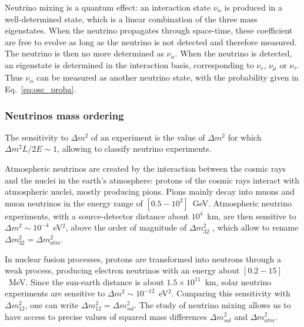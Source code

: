 Neutrino mixing is a quantum effect: an interaction state $\nu_{\alpha}$ is produced in a well-determined state, which is a linear combination of the three mass eigenstates.
When the neutrino propagates through space-time, these coefficient are free to evolve as long as the neutrino is not detected and therefore measured.
The neutrino is then no more determined as $\nu_{\alpha}$.
When the neutrino is detected, an eigenstate is determined in the interaction basis, corresponding to $\nu_e$, $\nu_{\mu}$ or $\nu_{\tau}$.
Thus $\nu_{\alpha}$ can be measured as another neutrino state, with the probability given in Eq.~\eqref{eq:osc_proba}.

\subsubsection*{Neutrinos mass ordering}

The sensitivity to $\Delta m^2$ of an experiment is the value of $\Delta m^2$ for which ${\Delta m^2 L/2E \sim 1}$, allowing to classify neutrino experiments.

Atmospheric neutrinos are created by the interaction between the cosmic rays and the nuclei in the earth's atmosphere: protons of the cosmic rays interact with atmospheric nuclei, mostly producing pions.
Pions mainly decay into muons and muon neutrinos in the energy range of $[0.5-10^2]$~GeV.
Atmospheric neutrino experiments, with a source-detector distance about $10^4$~km, are then sensitive to $\Delta m^2\sim 10^{-4}$~eV$^2$, above the order of magnitude of $\Delta m^2_{32}$ , which allow to rename $\Delta m^2_{32} = \Delta m^2_{atm}$.

In nuclear fusion processes, protons are transformed into neutrons through a weak process, producing electron neutrinos with an energy about $[0.2-15]$~MeV.
Since the sun-earth distance is about $1.5\times 10^{11}$~km, solar neutrino experiments are sensitive to $\Delta m^2 \sim 10^{-12}$~eV$^2$.
Comparing this sensitivity with $\Delta m^2_{12}$, one can write $\Delta m^2_{12} = \Delta m^2_{sol}$.
The study of neutrino mixing allows us to have access to precise values of squared mass differences $\Delta m^2_{sol}$ and $\Delta m^2_{atm}$.

